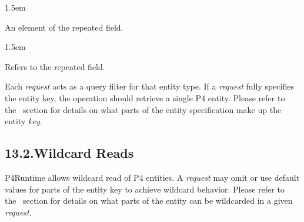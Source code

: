 \documentclass[11pt]{article}
\begin{document}
{%
\begin{mddefinitions}%


\begin{mdbmarginx}{}{}{}{1.5em}%
\begin{mddefdata}%
An element of the  repeated field.
\end{mddefdata}%
\end{mdbmarginx}%


\begin{mdbmarginx}{}{}{}{1.5em}%
\begin{mddefdata}%
Refers to the  repeated field.%
\end{mddefdata}%
\end{mdbmarginx}%
\end{mddefinitions}%

\noindent{}Each \emph{request} acts as a query filter for that entity type. If a \emph{request} fully
specifies the entity key, the  operation should retrieve a single P4
entity.  Please refer to the~ section
for details on what parts of the entity specification make up the entity \emph{key}.%

\subsection{13.2.\hspace*{0.5em}Wildcard Reads}\label{sec-wildcard-reads}%

\noindent{}P4Runtime allows wildcard read of P4 entities. A \emph{request} may omit or use
default values for parts of the entity key to achieve wildcard behavior. Please
refer to the~ section for details on
what parts of the entity can be wildcarded in a given \emph{request}.%

}
\end{document}
